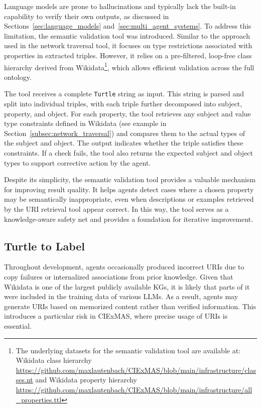 \documentclass[a4paper,oneside,bibliography=totoc]{scrbook}
\begin{document}
Language models are prone to hallucinations and typically lack the built-in capability to verify their own outputs, as discussed in Sections~\ref{sec:language_models} and~\ref{sec:multi_agent_systems}. To address this limitation, the semantic validation tool was introduced. Similar to the approach used in the network traversal tool, it focuses on type restrictions associated with properties in extracted triples. However, it relies on a pre-filtered, loop-free class hierarchy derived from Wikidata\footnote{The underlying datasets for the semantic validation tool are available at: Wikidata class hierarchy \url{https://github.com/maxlautenbach/CIExMAS/blob/main/infrastructure/classes.nt} and Wikidata property hierarchy \url{https://github.com/maxlautenbach/CIExMAS/blob/main/infrastructure/all_properties.ttl}}, which allows efficient validation across the full ontology.

The tool receives a complete \texttt{Turtle} string as input. This string is parsed and split into individual triples, with each triple further decomposed into subject, property, and object. For each property, the tool retrieves any subject and value type constraints defined in Wikidata (see example in Section~\ref{subsec:network_traversal}) and compares them to the actual types of the subject and object. The output indicates whether the triple satisfies these constraints. If a check fails, the tool also returns the expected subject and object types to support corrective action by the agent.

Despite its simplicity, the semantic validation tool provides a valuable mechanism for improving result quality. It helps agents detect cases where a chosen property may be semantically inappropriate, even when descriptions or examples retrieved by the \ac{URI} retrieval tool appear correct. In this way, the tool serves as a knowledge-aware safety net and provides a foundation for iterative improvement.


\subsection{Turtle to Label}
\label{subsec:turtle_to_label}

Throughout development, agents occasionally produced incorrect \acp{URI} due to copy failures or internalized associations from prior knowledge. Given that Wikidata is one of the largest publicly available \acp{KG}, it is likely that parts of it were included in the training data of various \acp{LLM}. As a result, agents may generate \acp{URI} based on memorized content rather than verified information. This introduces a particular risk in CIExMAS, where precise usage of \acp{URI} is essential.
\end{document}
